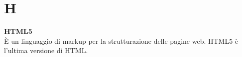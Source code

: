 \section{H}
\textbf{HTML5}\\
È un linguaggio di markup per la strutturazione delle pagine web. HTML5 è l’ultima versione di HTML. \\ \\
\clearpage